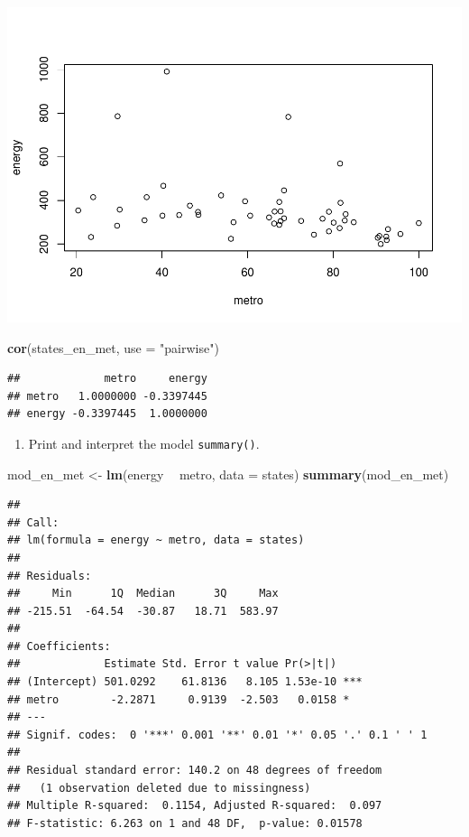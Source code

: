 \documentclass[]{book}
\newenvironment{Shaded}{\begin{snugshade}}{\end{snugshade}}
\newcommand{\DataTypeTok}[1]{\textcolor[rgb]{0.13,0.29,0.53}{#1}}
\newcommand{\KeywordTok}[1]{\textcolor[rgb]{0.13,0.29,0.53}{\textbf{#1}}}
\newcommand{\NormalTok}[1]{#1}
\newcommand{\OperatorTok}[1]{\textcolor[rgb]{0.81,0.36,0.00}{\textbf{#1}}}
\newcommand{\StringTok}[1]{\textcolor[rgb]{0.31,0.60,0.02}{#1}}
\providecommand{\tightlist}{%
  \setlength{\itemsep}{0pt}\setlength{\parskip}{0pt}}
\begin{document}
\includegraphics{R/Rmodels/figures/unnamed-chunk-100-1.pdf}

\begin{Shaded}
\begin{Highlighting}[]
  \KeywordTok{cor}\NormalTok{(states_en_met, }\DataTypeTok{use =} \StringTok{"pairwise"}\NormalTok{)}
\end{Highlighting}
\end{Shaded}

\begin{verbatim}
##             metro     energy
## metro   1.0000000 -0.3397445
## energy -0.3397445  1.0000000
\end{verbatim}

\begin{enumerate}
\def\labelenumi{\arabic{enumi}.}
\setcounter{enumi}{1}
\tightlist
\item
  Print and interpret the model \texttt{summary()}.
\end{enumerate}

\begin{Shaded}
\begin{Highlighting}[]
\NormalTok{  mod_en_met <-}\StringTok{ }\KeywordTok{lm}\NormalTok{(energy }\OperatorTok{~}\StringTok{ }\NormalTok{metro, }\DataTypeTok{data =}\NormalTok{ states)}
  \KeywordTok{summary}\NormalTok{(mod_en_met)}
\end{Highlighting}
\end{Shaded}

\begin{verbatim}
## 
## Call:
## lm(formula = energy ~ metro, data = states)
## 
## Residuals:
##     Min      1Q  Median      3Q     Max 
## -215.51  -64.54  -30.87   18.71  583.97 
## 
## Coefficients:
##             Estimate Std. Error t value Pr(>|t|)    
## (Intercept) 501.0292    61.8136   8.105 1.53e-10 ***
## metro        -2.2871     0.9139  -2.503   0.0158 *  
## ---
## Signif. codes:  0 '***' 0.001 '**' 0.01 '*' 0.05 '.' 0.1 ' ' 1
## 
## Residual standard error: 140.2 on 48 degrees of freedom
##   (1 observation deleted due to missingness)
## Multiple R-squared:  0.1154, Adjusted R-squared:  0.097 
## F-statistic: 6.263 on 1 and 48 DF,  p-value: 0.01578
\end{verbatim}
\end{document}
